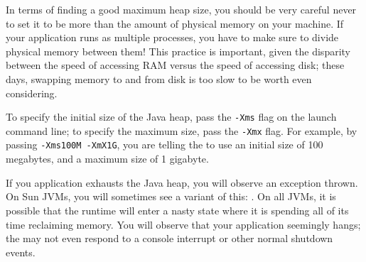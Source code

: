 In terms of finding a good maximum heap size, you should be very careful never
to set it to be more than the amount of physical memory on your machine. If your
application runs as multiple processes, you have to make sure to divide physical
memory between them! This practice is important, given the disparity between the
speed of accessing RAM versus the speed of accessing disk; these days, swapping
memory to and from disk is too slow to be worth even considering.


To specify the initial size of the Java heap, pass the {\tt -Xms} flag on
the launch command line; to specify the maximum size, pass the {\tt -Xmx} flag.
For example, by passing {\tt -Xms100M -XmX1G}, you are telling the \jre to use
an initial size of 100 megabytes, and a maximum size of 1 gigabyte.

If you application exhausts the Java heap, you will observe an
 exception thrown. On
Sun JVMs, you will sometimes see a variant of this: . On all JVMs, it is possible that
the runtime will enter a nasty state where it is spending all of its time
reclaiming memory. You will observe that your application seemingly hangs; the
\jre may not even respond to a console interrupt or other normal shutdown
events.










